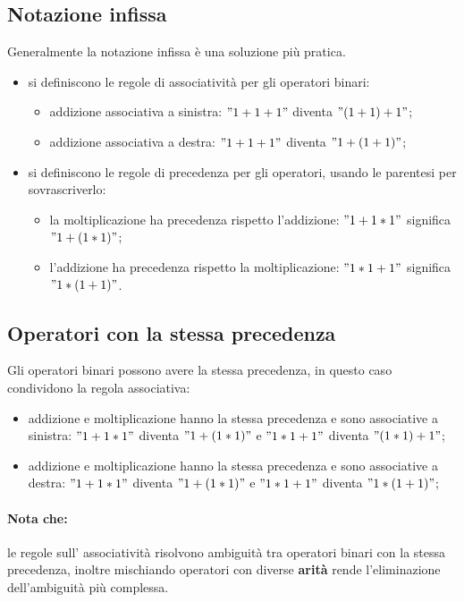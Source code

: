 \subsection{Notazione infissa}
Generalmente la notazione infissa è una soluzione più pratica.

\begin{itemize}
  \item si definiscono le regole di associatività per gli operatori binari:
    \begin{itemize}
      \item addizione associativa a sinistra: $"1+1+1"$ diventa $"(1+1)+1"$;
      \item addizione associativa a destra: $"1+1+1"$ diventa $"1+(1+1)"$;
    \end{itemize}
  \item si definiscono le regole di precedenza per gli operatori, usando
    le parentesi per sovrascriverlo:
    \begin{itemize}
      \item la moltiplicazione ha precedenza rispetto l'addizione: $"1+1*1"$
        significa $"1+(1*1)"$;
      \item l'addizione ha precedenza rispetto la moltiplicazione: $"1*1+1"$
        significa $"1*(1+1)"$.
    \end{itemize}
\end{itemize}

\subsection{Operatori con la stessa precedenza}
Gli operatori binari possono avere la stessa precedenza, in questo caso
condividono la regola associativa:
\begin{itemize}
  \item addizione e moltiplicazione hanno la stessa precedenza e sono
    associative a sinistra: $"1+1*1"$ diventa $"1+(1*1)"$ e $"1*1+1"$ diventa
    $"(1*1)+1"$;
  \item addizione e moltiplicazione hanno la stessa precedenza e sono
    associative a destra: $"1+1*1"$ diventa $"1+(1*1)"$ e $"1*1+1"$ diventa
    $"1*(1+1)"$;
\end{itemize}

\paragraph{Nota che:}
le regole sull' associatività risolvono ambiguità tra operatori binari con la
stessa precedenza, inoltre mischiando operatori con diverse \textbf{arità}
rende l'eliminazione dell'ambiguità più complessa.

